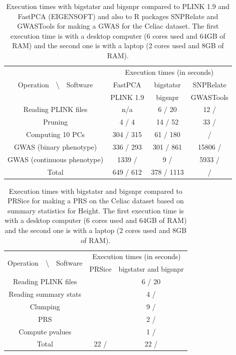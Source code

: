 \documentclass{bioinfo}
\begin{document}
\begin{table}[!tpb]
\begin{center}
\begin{adjustbox}{max width=235pt}
\begin{tabular}{|c|c|c|c|}
\hline
\multirow{3}{*}{Operation~~\textbackslash~~Software} &   \multicolumn{3}{c|}{Execution times (in seconds)} \\
 \cline{2-4}
 & FastPCA & bigstatsr  & SNPRelate \\
 & PLINK 1.9 & bigsnpr & GWASTools \\
\hline
Reading PLINK files & n/a & 6 / 20 & 12 /  \\
Pruning & 4 / 4 & 14 / 52 & 33 / \\  
Computing 10 PCs & 304 / 315 & 61 / 180 &  /  \\
GWAS (binary phenotype) & 336 / 293 & 301 / 861 & 15806 /  \\
GWAS (continuous phenotype) & 1339 /  & 9 /  & 5933 /  \\
\hline
Total & 649 / 612 & 378 / 1113 &  /  \\
\hline
\end{tabular} 
\end{adjustbox}
\end{center}
\caption{Execution times with bigstatsr and bigsnpr compared to PLINK 1.9 and FastPCA (EIGENSOFT) and also to R packages SNPRelate and GWASTools for making a GWAS for the Celiac dataset. The first execution time is with a desktop computer (6 cores used and 64GB of RAM) and the second one is with a laptop (2 cores used and 8GB of RAM).} 
\label{tab:bench-gwas}
\end{table}

\begin{table}[!tpb]
\begin{center}
\begin{adjustbox}{max width=235pt}
\begin{tabular}{|c|c|c|}
\hline
\multirow{2}{*}{Operation~~\textbackslash~~Software} &   \multicolumn{2}{c|}{Execution times (in seconds)} \\
 \cline{2-3}
 & PRSice & bigstatsr and bigsnpr \\
\hline
Reading PLINK files &  & 6 / 20 \\
Reading summary stats &  & 4 /   \\
Clumping &  & 9 /  \\
PRS &  & 2 /  \\
Compute pvalues &  & 1 /  \\
\hline
Total & 22 /  & 22 /  \\
\hline
\end{tabular} 
\end{adjustbox}
\end{center}
\caption{Execution times with bigstatsr and bigsnpr compared to PRSice for making a PRS on the Celiac dataset based on summary statistics for Height. The first execution time is with a desktop computer (6 cores used and 64GB of RAM) and the second one is with a laptop (2 cores used and 8GB of RAM).}
\label{tab:bench-prs}
\end{table}
\end{document}
